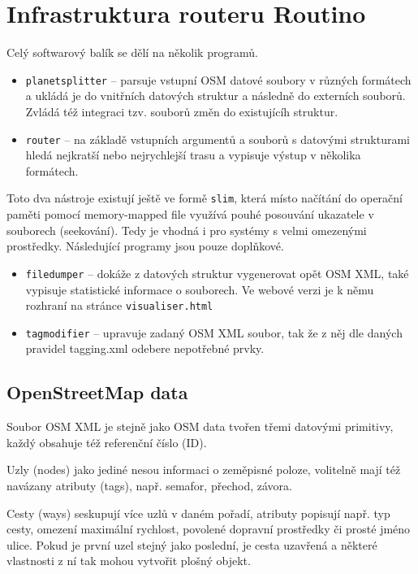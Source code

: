 \documentclass[thesis=B,czech]{FITthesis}[2012/06/26]
\begin{document}
\section{Infrastruktura routeru Routino}

Celý softwarový balík se dělí na několik programů.
\begin{itemize}
	\item{\verb|planetsplitter| -- parsuje vstupní OSM datové soubory v různých formátech a ukládá je do vnitřních datových struktur a následně do externích souborů. Zvládá též integraci tzv. souborů změn do existujícíh struktur. }
	\item{\verb|router| -- na základě vstupních argumentů a souborů s datovými strukturami hledá nejkratší nebo nejrychlejší trasu a vypisuje výstup v několika formátech.}
\end{itemize}	

Toto dva nástroje existují ještě ve formě \verb|slim|, která místo načítání do operační paměti pomocí memory-mapped file využívá pouhé posouvání ukazatele v souborech (seekování). Tedy je vhodná i pro systémy s velmi omezenými prostředky. Následující programy jsou pouze doplňkové.

\begin{itemize}
	\item{\verb|filedumper| -- dokáže z datových struktur vygenerovat opět OSM XML, také vypisuje statistické informace o souborech. Ve webové verzi je k němu rozhraní na stránce \verb|visualiser.html|}
	\item{\verb|tagmodifier| -- upravuje zadaný OSM XML soubor, tak že z něj dle daných pravidel tagging.xml odebere nepotřebné prvky.}
\end{itemize}


\subsection{OpenStreetMap data}
Soubor OSM XML je stejně jako OSM data tvořen třemi datovými primitivy, každý obsahuje též referenční číslo (ID).

 Uzly (nodes) jako jediné nesou informaci o zeměpisné poloze, volitelně mají též navázany atributy (tags), např. semafor, přechod, závora. 
 
 Cesty (ways) seskupují více uzlů v daném pořadí, atributy popisují např. typ cesty, omezení maximální rychlost, povolené dopravní prostředky či prosté jméno ulice. Pokud je první uzel stejný jako poslední, je cesta uzavřená a některé vlastnosti z ní tak mohou vytvořit plošný objekt.
 
\end{document}
